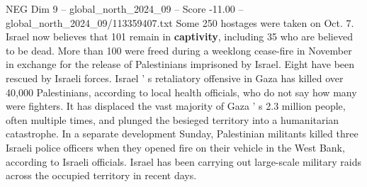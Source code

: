 \begin{textsample}{NEG Dim 9 – global\_north\_2024\_09 – Score -11.00 – global\_north\_2024\_09/113359407.txt}
Some 250 hostages were taken on Oct. 7.
Israel now believes that 101 remain in \textbf{captivity}, including 35 who are believed to be dead.
More than 100 were freed during a weeklong cease-fire in November in exchange for the release of Palestinians imprisoned by Israel.
Eight have been rescued by Israeli forces.
Israel ' s retaliatory offensive in Gaza has killed over 40,000 Palestinians, according to local health officials, who do not say how many were fighters.
It has displaced the vast majority of Gaza ' s 2.3 million people, often multiple times, and plunged the besieged territory into a humanitarian catastrophe.
In a separate development Sunday, Palestinian militants killed three Israeli police officers when they opened fire on their vehicle in the West Bank, according to Israeli officials.
Israel has been carrying out large-scale military raids across the occupied territory in recent days.

\end{textsample}
